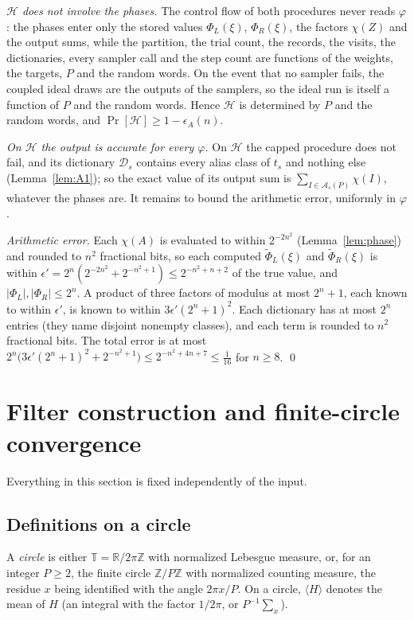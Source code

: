 \documentclass[11pt]{article}
\theoremstyle{definition}
\newcommand{\Z}{\mathbb Z}
\newcommand{\R}{\mathbb R}
\newcommand{\Tc}{\mathbb T}
\newcommand{\abs}[1]{\lvert #1\rvert}
\newcommand{\av}[1]{\langle #1\rangle}
\newcommand{\cA}{\mathcal A}
\newcommand{\cD}{\mathcal D}
\begin{document}
\emph{$\mathcal H$ does not involve the phases.} The control flow of both procedures never reads $\varphi$: the
phases enter only the stored values $\Phi_L(\xi)$, $\Phi_R(\xi)$, the factors $\chi(Z)$ and the output sums, while
the partition, the trial count, the records, the visits, the dictionaries, every sampler call and the step count
are functions of the weights, the targets, $P$ and the random words. On the event that no sampler fails, the
coupled ideal draws are the outputs of the samplers, so the ideal run is itself a function of $P$ and the random
words. Hence $\mathcal H$ is determined by $P$ and the random words, and $\Pr[\mathcal H]\ge1-\epsilon_A(n)$.

\emph{On $\mathcal H$ the output is accurate for every $\varphi$.} On $\mathcal H$ the capped procedure does not
fail, and its dictionary
$\cD_s$ contains every alias class of $t_s$ and nothing else (Lemma~\ref{lem:A1}); so the exact value of its output
sum is $\sum_{I\in\cA_s(P)}\chi(I)$, whatever the phases are. It remains to bound the arithmetic error, uniformly
in $\varphi$.

\emph{Arithmetic error.} Each $\chi(A)$ is evaluated to within $2^{-2n^2}$ (Lemma~\ref{lem:phase}) and rounded to
$n^2$ fractional bits, so each computed $\tilde\Phi_L(\xi)$ and $\tilde\Phi_R(\xi)$ is within
$\epsilon'=2^{n}(2^{-2n^2}+2^{-n^2+1})\le2^{-n^2+n+2}$ of the true value, and $\abs{\Phi_L},\abs{\Phi_R}\le2^n$. A
product of three factors of modulus at most $2^n+1$, each known to within $\epsilon'$, is known to within
$3\epsilon'(2^n+1)^2$. Each dictionary has at most $2^n$ entries (they name disjoint nonempty classes), and each term
is rounded to $n^2$ fractional bits. The total error is at most
$2^n\bigl(3\epsilon'(2^n+1)^2+2^{-n^2+1}\bigr)\le2^{-n^2+4n+7}\le\tfrac1{16}$ for $n\ge8$. \qed
\section{Filter construction and finite-circle convergence}\label{sec:filter}
Everything in this section is fixed independently of the input.

\subsection{Definitions on a circle}
A \emph{circle} is either $\Tc=\R/2\pi\Z$ with normalized Lebesgue measure, or, for an integer $P\ge2$, the finite
circle $\Z/P\Z$ with normalized counting measure, the residue $x$ being identified with the angle $2\pi x/P$. On a
circle, $\av H$ denotes the mean of $H$ (an integral with the factor $1/2\pi$, or $P^{-1}\sum_x$).
\end{document}
